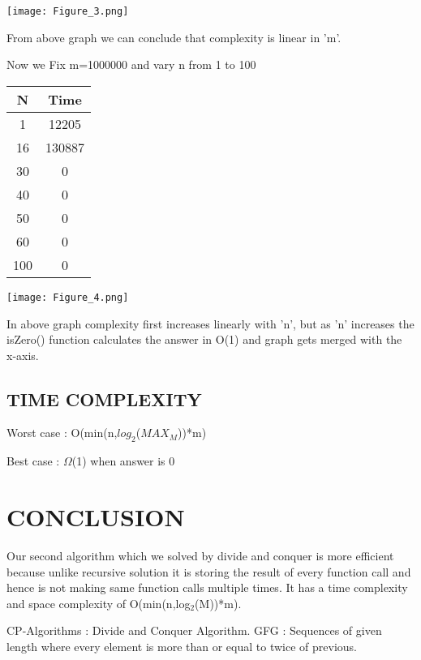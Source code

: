 \documentclass[conference]{IEEEtran}
\begin{document}
\texttt{[image: Figure\_3.png]}

From above graph we can conclude that complexity is linear in 'm'.

Now we Fix m=1000000 and vary n from 1 to 100

\begin{center}
   \begin{tabular}{|c|c|}
   \hline
   N & Time \\
   \hline\hline
    1 & 12205 \\
    \hline
    16 & 130887 \\
    \hline
    30 & 0 \\
    \hline
    40 & 0 \\
    \hline
    50 & 0 \\
    \hline
    60 & 0 \\
    \hline
    100 & 0 \\
    \hline
    \end{tabular} 
\end{center}

\texttt{[image: Figure\_4.png]}

In above graph complexity first increases linearly with 'n', but as 'n' increases the isZero() function calculates the answer in O(1) and graph gets merged with the x-axis. 

\subsection{TIME COMPLEXITY}

Worst case : O(min(n,$log_2$($MAX_M$))*m)

Best case  : $\Omega$(1) when answer is 0

\section*{CONCLUSION}

Our second algorithm which we solved by divide and conquer is more efficient because unlike recursive solution  it is storing the result of every function call and hence is not making same function calls multiple times. It has a time complexity and space complexity of O(min(n,log$_{2}$(M))*m).

\begin{thebibliography}{00}
 CP-Algorithms : Divide and Conquer Algorithm.
 GFG : Sequences of given length where every element is more than or equal to twice of previous.
\end{thebibliography}
\end{document}
